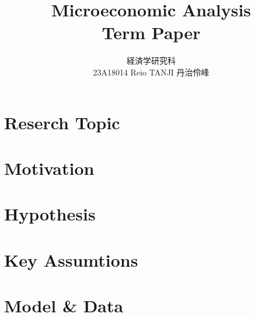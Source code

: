 \documentclass{jsarticle}[12pt]
\begin{document}
\title{Microeconomic Analysis \\
Term Paper}
\author{経済学研究科　 \\ 23A18014 Reio TANJI 丹治伶峰}
\date{}
\maketitle

\section{Reserch Topic}



\section{Motivation}



\section{Hypothesis}



\section{Key Assumtions}



\section{Model \& Data}
\end{document}
